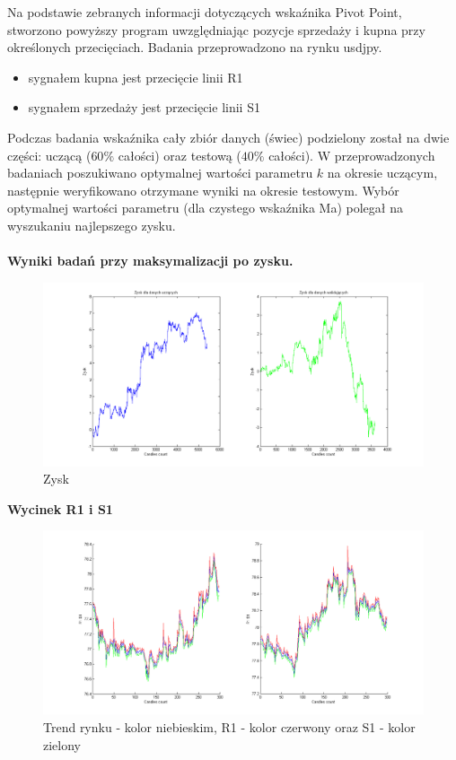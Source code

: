 Na podstawie zebranych informacji dotyczących wskaźnika Pivot Point, stworzono powyższy program uwzględniając pozycje sprzedaży i kupna przy określonych przecięciach. Badania przeprowadzono na rynku usdjpy.
\begin{itemize}
\item sygnałem kupna jest przecięcie linii R1
\item sygnałem sprzedaży jest przecięcie linii S1
\newline
\end{itemize}
Podczas badania wskaźnika cały zbiór danych (świec) podzielony został na dwie części: uczącą ($60\%$ całości) oraz testową ($40\%$ całości). W przeprowadzonych badaniach poszukiwano optymalnej wartości parametru $k$ na okresie uczącym, następnie weryfikowano otrzymane wyniki na okresie testowym. Wybór optymalnej wartości parametru (dla czystego wskaźnika Ma) polegał na wyszukaniu najlepszego zysku. \\

\noindent \textbf{\\Wyniki badań przy maksymalizacji po zysku.}\\
\begin{figure}[h!]
\centering
\includegraphics[scale=0.4]{pp_zysk_us.png}
\caption{Zysk}

\end{figure}
\FloatBarrier

\newpage
\noindent \textbf{Wycinek R1 i S1}\\
\begin{figure}[h!]
\centering
\includegraphics[scale=0.4]{pp_rs_us.png}
\caption{Trend rynku - kolor niebieskim, R1 - kolor czerwony oraz S1 - kolor zielony }
\end{figure}
\FloatBarrier
%
